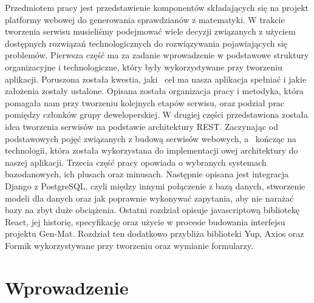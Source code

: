 \documentclass[oneside,polski,logo,indent]{amuthesis}
\date{Poznań, \today{} r.}
\begin{document}
\maketitle
\makestatement

\begin{streszczenie}
Przedmiotem pracy jest przedstawienie komponentów składających się na projekt platformy webowej do generowania sprawdzianów z matematyki. W trakcie tworzenia serwisu musieliśmy podejmować wiele decyzji związanych z użyciem dostępnych rozwiązań technologicznych do rozwiązywania pojawiających się problemów.
Pierwsza część ma za zadanie wprowadzenie w podstawowe struktury organizacyjne i technologiczne, który były wykorzystywane przy tworzeniu aplikacji. Poruszona została kwestia, jaki~ cel ma nasza aplikacja spełniać i jakie założenia zostały ustalone. Opisana została organizacja pracy i metodyka, która pomagała nam przy tworzeniu kolejnych etapów serwisu, oraz podział prac pomiędzy członków grupy deweloperskiej.
W drugiej części przedstawiona została idea tworzenia serwisów na podstawie architektury REST. Zaczynając od podstawowych pojęć związanych z budową serwisów webowych, a~ kończąc na technologii, która została wykorzystana do implementacji owej architektury do naszej aplikacji.
Trzecia część pracy opowiada o wybranych systemach bazodanowych, ich plusach oraz minusach. Następnie opisana jest integracja Django z PostgreSQL, czyli między innymi połączenie z bazą danych, stworzenie modeli dla danych oraz jak poprawnie wykonywać zapytania, aby nie narażać bazy na zbyt duże obciążenia.
Ostatni rozdział opisuje javascriptową bibliotekę React, jej historię, specyfikację oraz użycie w procesie budowania interfejsu projektu Gen-Mat. Rozdział ten dodatkowo przybliża biblioteki Yup, Axios oraz Formik wykorzystywane przy tworzeniu oraz wymianie formularzy.
\end{streszczenie}


\tableofcontents


\chapter{Wprowadzenie}
\end{document}
